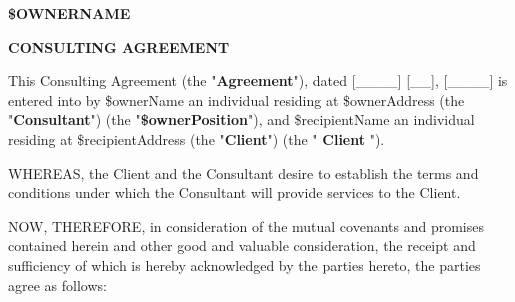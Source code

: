 \documentclass[12pt]{article}
\begin{document}
\begin{center}
{\scshape\Large \par}
\vspace{1.5cm}
{\huge\bfseries \uppercase{\${ownerName}} \par}
\vspace{1cm}
{\huge\bfseries CONSULTING AGREEMENT \par}
\end{center}

This Consulting Agreement (the "{\bf Agreement}"), dated [\_\_\_\_] [\_\_], [\_\_\_\_] is entered into by \${ownerName} an individual residing at \${ownerAddress} (the "{\bf Consultant}") (the "{\bf \${ownerPosition}}"), and \${recipientName} an individual residing at \${recipientAddress} (the "{\bf Client}") (the "{\bf
    Client
}").

WHEREAS, the Client and the Consultant desire to establish the terms and conditions under which the Consultant will provide services to the Client.

NOW, THEREFORE, in consideration of the mutual covenants and promises contained herein and other good and valuable consideration, the receipt and sufficiency of which is hereby acknowledged by the parties hereto, the parties agree as follows:
\end{document}
